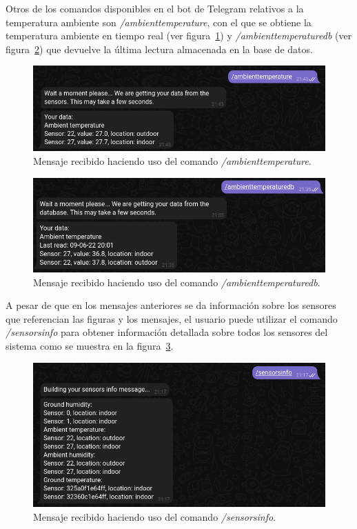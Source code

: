 \documentclass[a4paper, 12pt, oneside]{book}
\begin{document}
Otros de los comandos disponibles en el bot de Telegram relativos a la temperatura ambiente son \textit{/ambienttemperature}, con el que se obtiene la temperatura ambiente en tiempo real (ver figura~\ref{figura:ambienttemperature}) y \textit{/ambienttemperaturedb} (ver figura~\ref{figura:ambienttemperaturedb}) que devuelve la última lectura almacenada en la base de datos.
\begin{figure}[H]
	\centering
    \includegraphics[width=12cm, keepaspectratio]{img/ambienttemperature}
    \caption{Mensaje recibido haciendo uso del comando \textit{/ambienttemperature}.}
    \label{figura:ambienttemperature}
\end{figure}
\begin{figure}[H]
	\centering
    \includegraphics[width=12cm, keepaspectratio]{img/ambienttemperaturedb}
    \caption{Mensaje recibido haciendo uso del comando \textit{/ambienttemperaturedb}.}
    \label{figura:ambienttemperaturedb}
\end{figure}

A pesar de que en los mensajes anteriores se da información sobre los sensores que referencian las figuras y los mensajes, el usuario puede utilizar el comando \textit{/sensorsinfo} para obtener información detallada sobre todos los sensores del sistema como se muestra en la figura~\ref{figura:sensorsinfo}.

\begin{figure}[H]
	\centering
    \includegraphics[width=12cm, keepaspectratio]{img/sensorsinfo}
    \caption{Mensaje recibido haciendo uso del comando \textit{/sensorsinfo}.}
    \label{figura:sensorsinfo}
\end{figure}
\end{document}
